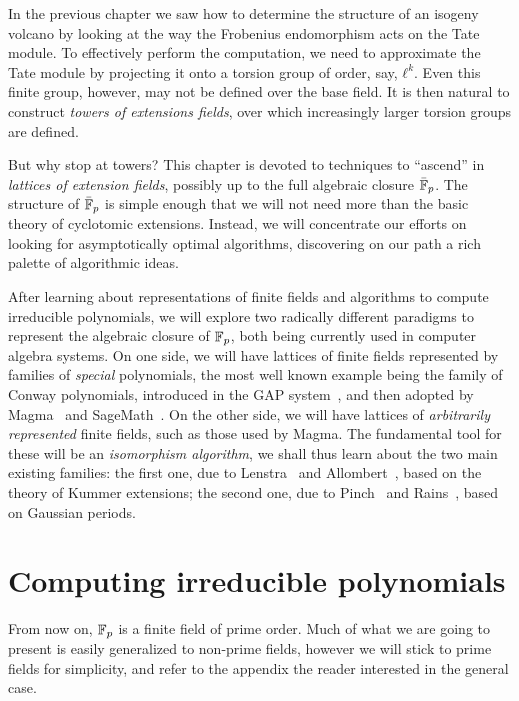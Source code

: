 \documentclass[b5layout]{hdr}
\begin{document}
In the previous chapter we saw how to determine the structure of an
isogeny volcano by looking at the way the Frobenius endomorphism acts
on the Tate module. %
To effectively perform the computation, we need to approximate the
Tate module by projecting it onto a torsion group of order, say,
$ℓ^k$. %
Even this finite group, however, may not be defined over the base
field. %
It is then natural to construct \emph{towers of extensions fields},
over which increasingly larger torsion groups are defined. %

But why stop at towers? %
This chapter is devoted to techniques to ``ascend'' in \emph{lattices
  of extension fields}, possibly up to the full algebraic closure
$\bar{\mathbb{F}}_p$. %
The structure of $\bar{\mathbb{F}}_p$ is simple enough that we will not need
more than the basic theory of cyclotomic extensions. %
Instead, we will concentrate our efforts on looking for asymptotically
optimal algorithms, discovering on our path a rich palette of
algorithmic ideas. %

After learning about representations of finite fields and algorithms
to compute irreducible polynomials, we will explore two radically
different paradigms to represent the algebraic closure of $\mathbb{F}_p$, both
being currently used in computer algebra systems. %
On one side, we will have lattices of finite fields represented by
families of \emph{special} polynomials, the most well known example
being the family of Conway polynomials, introduced in the GAP
system~\cite{GAP4}, and then adopted by Magma~\cite{MAGMA} and
SageMath~\cite{Sage}. %
On the other side, we will have lattices of \emph{arbitrarily
  represented} finite fields, such as those used by Magma. %
The fundamental tool for these will be an \emph{isomorphism
  algorithm}, we shall thus learn about the two main existing
families: the first one, due to Lenstra~\cite{LenstraJr91} and
Allombert~\cite{Allombert02}, based on the theory of Kummer
extensions; the second one, due to Pinch~\cite{Pinch} and
Rains~\cite{rains2008}, based on Gaussian periods. %



\section{Computing irreducible polynomials}

From now on, $\mathbb{F}_p$ is a finite field of prime order. %
Much of what we are going to present is easily generalized to
non-prime fields, however we will stick to prime fields for
simplicity, and refer to the appendix the reader interested in
the general case. %
\end{document}
